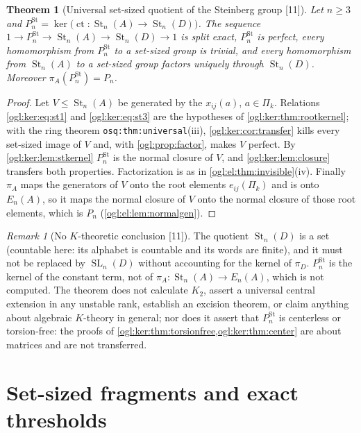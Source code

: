 \documentclass[11pt,oneside]{article}
\numberwithin{equation}{section}
\newtheorem{theorem}{Theorem}[section]
\theoremstyle{definition}
\theoremstyle{remark}
\newtheorem{remark}[remark]{Remark}
\newcommand{\ct}{\operatorname{ct}}
\newcommand{\SL}{\operatorname{SL}}
\newcommand{\St}{\operatorname{St}}
\newcommand{\src}[1]{\textup{\textsf{\small[#1]}}}
\newcommand{\replabel}[1]{\nolinkurl{#1}}
\begin{document}
\begin{theorem}[Universal set-sized quotient of the Steinberg group \src{11}]\label{ogl:ker:thm:steinberg}
Let $n\ge3$ and $P_n^{\St}=\ker\bigl(\ct:\St_n(A)\to\St_n(D)\bigr)$. The sequence
$1\to P_n^{\St}\to\St_n(A)\to\St_n(D)\to1$ is split exact, $P_n^{\St}$ is perfect,
every homomorphism from $P_n^{\St}$ to a set-sized group is trivial, and every
homomorphism from $\St_n(A)$ to a set-sized group factors uniquely through
$\St_n(D)$. Moreover $\pi_A(P_n^{\St})=P_n$.
\end{theorem}
\begin{proof}
Let $V\le\St_n(A)$ be generated by the $x_{ij}(a)$, $a\in\Pi_k$. Relations
\eqref{ogl:ker:eq:st1} and \eqref{ogl:ker:eq:st3} are the hypotheses of
\cref{ogl:ker:thm:rootkernel}; with the ring theorem
\replabel{osq:thm:universal}(iii), \cref{ogl:ker:cor:transfer} kills every
set-sized image of $V$ and, with \cref{ogl:prop:factor}, makes $V$ perfect. By
\cref{ogl:ker:lem:stkernel} $P_n^{\St}$ is the normal closure of $V$, and
\cref{ogl:ker:lem:closure} transfers both properties. Factorization is as in
\cref{ogl:el:thm:invisible}(iv). Finally $\pi_A$ maps the generators of $V$ onto
the root elements $e_{ij}(\Pi_k)$ and is onto $E_n(A)$, so it maps the normal
closure of $V$ onto the normal closure of those root elements, which is $P_n$
(\cref{ogl:el:lem:normalgen}).
\end{proof}

\begin{remark}[No $K$-theoretic conclusion \src{11}]\label{ogl:ker:rem:noK}
The quotient $\St_n(D)$ is a set (countable here: its alphabet is countable and
its words are finite), and it must not be replaced by $\SL_n(D)$ without
accounting for the kernel of $\pi_D$. $P_n^{\St}$ is the kernel of the constant
term, not of $\pi_A:\St_n(A)\to E_n(A)$, which is not computed. The theorem does
not calculate $K_2$, assert a universal central extension in any unstable rank,
establish an excision theorem, or claim anything about algebraic $K$-theory in
general; nor does it assert that $P_n^{\St}$ is centerless or torsion-free: the
proofs of \cref{ogl:ker:thm:torsionfree,ogl:ker:thm:center} are about matrices
and are not transferred.
\end{remark}

\section{Set-sized fragments and exact thresholds}\label{ogl:ker:sec:fragments}
\end{document}
